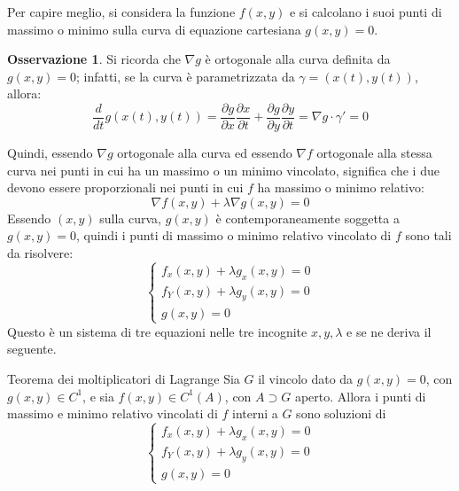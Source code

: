 \documentclass[11pt, a4paper]{scrartcl}
\theoremstyle{definition}
\numberwithin{esempio}{section}
\theoremstyle{definition}
\newtheorem{obs}{Osservazione}
\numberwithin{obs}{section}
\numberwithin{nota}{section}
\numberwithin{equation}{subsection}
\begin{document}
Per capire meglio, si considera la funzione $f(x,y)$ e si calcolano i suoi punti di massimo o minimo sulla curva di equazione cartesiana $g(x,y) =0 $.
\begin{obs}
	Si ricorda che $\nabla g$ \`e ortogonale alla curva definita da $g(x,y) = 0$; infatti, se la curva \`e parametrizzata da $\gamma=(x(t),y(t))$, allora:
	\[
	\frac{d }{d t} g(x(t),y(t)) = \frac{\partial g}{\partial x} \frac{\partial x}{\partial t} + \frac{\partial g}{\partial y} \frac{\partial y}{\partial t} = \nabla g \cdot \gamma' = 0
	\] 
\end{obs}
	Quindi, essendo $\nabla g$ ortogonale alla curva ed essendo $\nabla f$ ortogonale alla stessa curva nei punti in cui ha un massimo o un minimo vincolato, significa che i due devono essere proporzionali nei punti in cui $f$ ha massimo o minimo relativo:
	\[
	\nabla f(x,y) + \lambda \nabla g(x,y) = 0 
	\] 
Essendo $(x,y)$ sulla curva, $g(x,y)$ \`e contemporaneamente soggetta a $g(x,y) = 0$, quindi i punti di massimo o minimo relativo vincolato di $f$ sono tali da risolvere:
\begin{equation}
	\begin{cases}
		f_x(x,y) + \lambda g_x(x,y) = 0 \\
		f_Y(x,y) + \lambda g_y(x,y) =0\\
		g(x,y) = 0
	\end{cases}
\end{equation}
Questo \`e un sistema di tre equazioni nelle tre incognite $x,y,\lambda $ e se ne deriva il seguente.
\begin{teorema}
	{Teorema dei moltiplicatori di Lagrange}{}
	Sia $G$ il vincolo dato da $g(x,y) = 0$, con $g(x,y) \in C^1$, e sia $f(x,y)\in C^1(A)$, con $A \supset G$ aperto. 
	Allora i punti di massimo e minimo relativo vincolati di $f$ interni a $G$ sono soluzioni di
	\[
	\begin{cases}
		f_x(x,y) + \lambda g_x(x,y) = 0 \\
		f_Y(x,y) + \lambda g_y(x,y) =0\\
		g(x,y) = 0
	\end{cases}
	\] 
\end{teorema}
\end{document}
